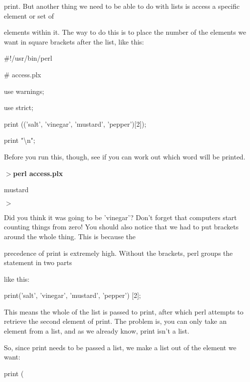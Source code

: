 \documentclass[a4paper,11pt]{book}
\begin{document}
\noindent print. But another thing we need to be able to do with lists is access a specific element or set of

\noindent elements within it. The way to do this is to place the number of the elements we want in square brackets after the list, like this:

\noindent 

\noindent 

\noindent \#!/usr/bin/perl

\noindent \# access.plx

\noindent use warnings;

\noindent use strict;

\noindent 

\noindent print (('salt', 'vinegar', 'mustard', 'pepper')[2]);

\noindent print "\textbackslash n";

\noindent 

\noindent Before you run this, though, see if you can work out which word will be printed.

\noindent 

\noindent $>$\textbf{perl access.plx}

\noindent mustard

\noindent $>$

\noindent Did you think it was going to be 'vinegar'? Don't forget that computers start counting things from zero! You should also notice that we had to put brackets around the whole thing. This is because the

\noindent precedence of print is extremely high. Without the brackets, perl groups the statement in two parts

\noindent like this:

\noindent 

\noindent 

\noindent print('salt', 'vinegar', 'mustard', 'pepper') [2];

\noindent 

\noindent This means the whole of the list is passed to print, after which perl attempts to retrieve the second element of print. The problem is, you can only take an element from a list, and as we already know, print isn't a list.

\noindent 

\noindent So, since print needs to be passed a list, we make a list out of the element we want:

\noindent 

\noindent print (
\end{document}
